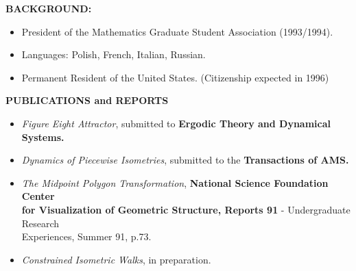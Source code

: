 \hspace{-.29in} {\bf BACKGROUND:}
\begin{itemize}
\vspace{-.06in}
\item  President of the Mathematics Graduate Student Association (1993/1994).  \vspace{-.06in}
\item   Languages:   Polish, French, Italian, Russian.  
\vspace{-.06in}
\item Permanent Resident of the  United States. (Citizenship expected in 1996)
\end{itemize}

\vspace{.12in}
 
  \hspace{-.29in} {\bf  PUBLICATIONS and REPORTS }
\begin{itemize}
\vspace{-.08in}

\item    {\em Figure Eight Attractor},  
submitted to {\bf Ergodic Theory and Dynamical Systems.}

  \vspace{-.08in}
\item  {\em Dynamics of Piecewise Isometries},    
submitted to the {\bf Transactions of AMS.}
\vspace{-.08in}
\item    {\em The  Midpoint   Polygon  Transformation},  
{\bf National Science Foundation Center\\ for Visualization of Geometric Structure, Reports  91} - 
        Undergraduate    Research\\
Experiences,  Summer 91,  p.73.
\vspace{-.08in}
\item  { \em Constrained Isometric Walks},  in preparation.


\end{itemize}










			

